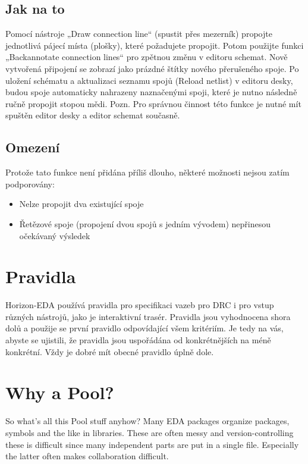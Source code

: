 \documentclass[letterpaper,10pt,czech]{sphinxmanual}
\begin{document}
\section{Jak na to}
\label{\detokenize{backannotation:jak-na-to}}
Pomocí nástroje „Draw connection line“ (spustit přes mezerník) propojte jednotlivá pájecí místa (plošky), které požadujete propojit. Potom použijte funkci „Backannotate connection lines“ pro zpětnou změnu v editoru schemat. Nově vytvořená připojení se zobrazí jako prázdné štítky nového přerušeného spoje. Po uložení schématu a aktualizaci seznamu spojů (Reload netlist) v editoru desky, budou spoje automaticky nahrazeny naznačenými spoji, které je nutno následně ručně propojit stopou mědi. Pozn. Pro správnou činnost této funkce je nutné mít spuštěn editor desky a editor schemat současně.


\section{Omezení}
\label{\detokenize{backannotation:omezeni}}
Protože tato funkce není přidána příliš dlouho, některé možnosti nejsou zatím podporovány:
\begin{itemize}
\item {} 
Nelze propojit dva existující spoje

\item {} 
Řetězové spoje (propojení dvou spojů s jedním vývodem) nepřinesou očekávaný výsledek

\end{itemize}


\chapter{Pravidla}
\label{\detokenize{rules:pravidla}}\label{\detokenize{rules::doc}}
Horizon-EDA používá pravidla pro specifikaci vazeb pro DRC i pro vstup různých nástrojů, jako je interaktivní trasér. Pravidla jsou vyhodnocena shora dolů a použije se první pravidlo odpovídající všem kritériím. Je tedy na vás, abyste se ujistili, že pravidla jsou uspořádána od konkrétnějších na méně konkrétní. Vždy je dobré mít obecné pravidlo úplně dole.


\chapter{Why a Pool?}
\label{\detokenize{pool-why:why-a-pool}}\label{\detokenize{pool-why::doc}}
So what’s all this Pool stuff anyhow? Many EDA packages organize
packages, symbols and the like in libraries. These are often messy
and version-controlling these is difficult since many independent
parts are put in a single file. Especially the latter often makes collaboration
difficult.
\end{document}

